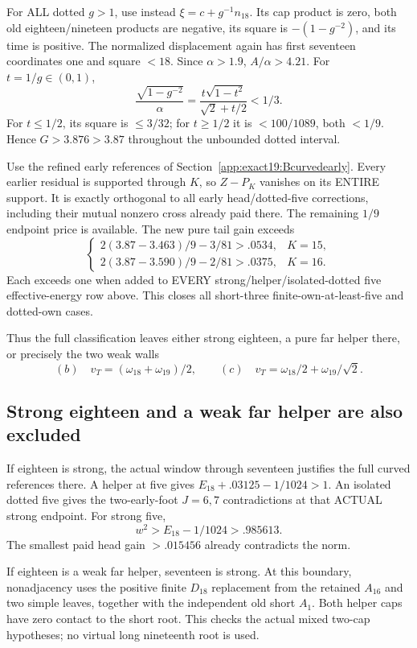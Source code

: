 For ALL dotted \(g>1\), use instead
\(\xi=c+g^{-1}n_{18}\).
Its cap product is zero, both
old eighteen/nineteen products
are negative, its square is
\(-(1-g^{-2})\), and its time
is positive.
The normalized displacement again
has first seventeen coordinates
one and square \(<18\).
Since \(\alpha>1.9\),
\(A/\alpha>4.21\).
For \(t=1/g\in(0,1)\),
\[
 \frac{\sqrt{1-g^{-2}}}{\alpha}
       =\frac{t\sqrt{1-t^2}}{\sqrt2+t/2}<1/3 .
\]
For \(t\le1/2\), its square is
\(\le3/32\); for \(t\ge1/2\)
it is \(<100/1089\), both \(<1/9\).
Hence \(G>3.876>3.87\) throughout
the unbounded dotted interval.

Use the refined early references
of Section~\ref{app:exact19:Bcurvedearly}.
Every earlier residual is supported
through \(K\), so \(Z-P_K\)
vanishes on its ENTIRE support.
It is exactly orthogonal to all
early head/dotted-five corrections,
including their mutual nonzero
cross already paid there.
The remaining \(1/9\) endpoint
price is available.
The new pure tail gain exceeds
\[
 \begin{cases}
 2(3.87-3.463)/9-3/81>.0534,&K=15,\\
 2(3.87-3.590)/9-2/81>.0375,&K=16 .
 \end{cases}
\]
Each exceeds one when added to
EVERY strong/helper/isolated-dotted
five effective-energy row above.
This closes all short-three
finite-own-at-least-five and
dotted-own cases.

Thus the full classification
leaves either strong eighteen,
a pure far helper there, or
precisely the two weak walls
\[
       (b)\quad v_T=(\omega_{18}+\omega_{19})/2,\qquad
       (c)\quad v_T=\omega_{18}/2+\omega_{19}/\sqrt2 .
\tag{B19survivors}\label{app:exact19:eq:Bsurvivors}
\]

\subsection{Strong eighteen and a weak far helper are also excluded}
\label{app:exact19:Bendstates}

If eighteen is strong, the actual
window through seventeen justifies
the full curved references there.
A helper at five gives
\(E_{18}+.03125-1/1024>1\).
An isolated dotted five gives
the two-early-foot \(J=6,7\)
contradictions at that ACTUAL
strong endpoint.
For strong five,
\[
                      w^2>E_{18}-1/1024>.985613 .
\]
The smallest paid head gain
\(>.015456\) already contradicts
the norm.

If eighteen is a weak far helper,
seventeen is strong.
At this boundary, nonadjacency
uses the positive finite
\(D_{18}\) replacement from
the retained \(A_{16}\) and two
simple leaves, together with the
independent old short \(A_1\).
Both helper caps have zero
contact to the short root.
This checks the actual mixed
two-cap hypotheses; no virtual
long nineteenth root is used.

